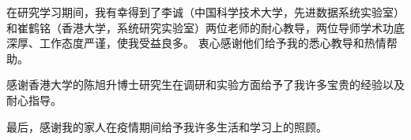 
\begin{acknowledgements}

在研究学习期间，我有幸得到了李诚（中国科学技术大学，先进数据系统实验室）和崔鹤铭（香港大学，系统研究实验室）两位老师的耐心教导，两位导师学术功底深厚、工作态度严谨，使我受益良多。
衷心感谢他们给予我的悉心教导和热情帮助。

感谢香港大学的陈旭升博士研究生在调研和实验方面给予了我许多宝贵的经验以及耐心指导。

最后，感谢我的家人在疫情期间给予我许多生活和学习上的照顾。
\end{acknowledgements}

